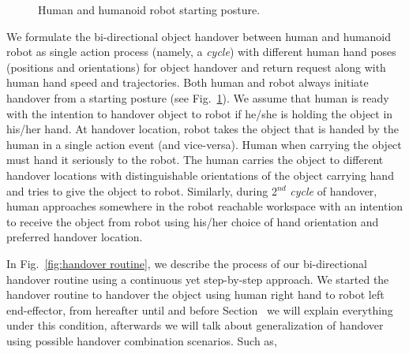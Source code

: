 \begin{figure}[htbp]
		\caption{Human and humanoid robot starting posture.}
		\label{fig:halfsit}
\end{figure}

We formulate the bi-directional object handover between human and humanoid robot as single action process (namely, a \textit{cycle}) with different human hand poses (positions and orientations) for object handover and return request along with human hand speed and trajectories. Both human and robot always initiate handover from a starting posture (see Fig.~\ref{fig:halfsit}). We assume that human is ready with the intention to handover object to robot if he/she is holding the object in his/her hand. At handover location, robot takes the object that is handed by the human in a single action event (and vice-versa). Human when carrying the object must hand it seriously to the robot. The human carries the object to different handover locations with distinguishable orientations of the object carrying hand and tries to give the object to robot. Similarly, during 2$^{nd}$ \textit{cycle} of handover, human approaches somewhere in the robot reachable workspace with an intention to receive the object from robot using his/her choice of hand orientation and preferred handover location. 


In Fig.~\ref{fig:handover routine}, we describe the process of our bi-directional handover routine using a continuous yet step-by-step approach. We started the handover routine to handover the object using human right hand to robot left end-effector, from hereafter until and before Section~ we will explain everything under this condition, afterwards we will talk about generalization of handover using possible handover combination scenarios. Such as,

